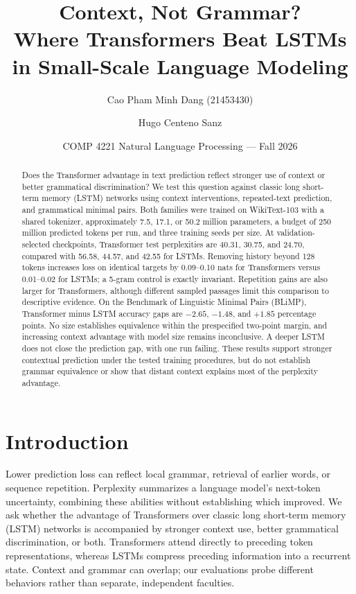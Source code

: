 \documentclass[10pt]{article}
\title{\vspace{-1.5em}\textbf{Context, Not Grammar?}\\
Where Transformers Beat LSTMs in Small-Scale Language Modeling}
\author{Cao Pham Minh Dang (21453430) \and Hugo Centeno Sanz}
\date{COMP 4221 Natural Language Processing --- Fall 2026}
\begin{document}
\maketitle

\begin{abstract}
Does the Transformer advantage in text prediction reflect stronger use of context or better grammatical discrimination? We test this question against classic long short-term memory (LSTM) networks using context interventions, repeated-text prediction, and grammatical minimal pairs. Both families were trained on WikiText-103 with a shared tokenizer, approximately 7.5, 17.1, or 50.2 million parameters, a budget of 250 million predicted tokens per run, and three training seeds per size. At validation-selected checkpoints, Transformer test perplexities are 40.31, 30.75, and 24.70, compared with 56.58, 44.57, and 42.55 for LSTMs. Removing history beyond 128 tokens increases loss on identical targets by 0.09--0.10 nats for Transformers versus 0.01--0.02 for LSTMs; a 5-gram control is exactly invariant. Repetition gains are also larger for Transformers, although different sampled passages limit this comparison to descriptive evidence. On the Benchmark of Linguistic Minimal Pairs (BLiMP), Transformer minus LSTM accuracy gaps are $-2.65$, $-1.48$, and $+1.85$ percentage points. No size establishes equivalence within the prespecified two-point margin, and increasing context advantage with model size remains inconclusive. A deeper LSTM does not close the prediction gap, with one run failing. These results support stronger contextual prediction under the tested training procedures, but do not establish grammar equivalence or show that distant context explains most of the perplexity advantage.
\end{abstract}

\section{Introduction}

Lower prediction loss can reflect local grammar, retrieval of earlier words, or sequence repetition. Perplexity summarizes a language model's next-token uncertainty, combining these abilities without establishing which improved. We ask whether the advantage of Transformers over classic long short-term memory (LSTM) networks is accompanied by stronger context use, better grammatical discrimination, or both. Transformers attend directly to preceding token representations, whereas LSTMs compress preceding information into a recurrent state. Context and grammar can overlap; our evaluations probe different behaviors rather than separate, independent faculties.
\end{document}
